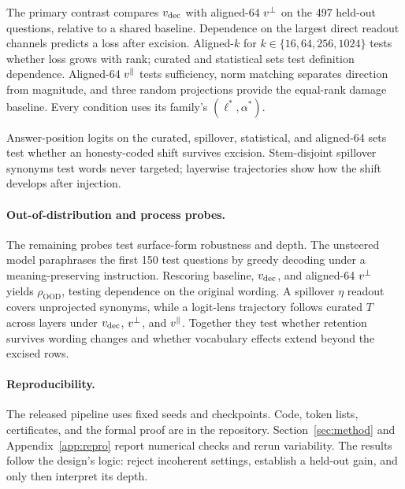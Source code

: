 The primary contrast compares $v_{\mathrm{dec}}$ with aligned-64 $v^{\perp}$ on the 497 held-out questions, relative to a shared baseline. Dependence on the largest direct readout channels predicts a loss after excision. Aligned-$k$ for $k \in \{16, 64, 256, 1024\}$ tests whether loss grows with rank; curated and statistical sets test definition dependence. Aligned-64 $v^{\parallel}$ tests sufficiency, norm matching separates direction from magnitude, and three random projections provide the equal-rank damage baseline. Every condition uses its family's $(\ell^{*}, \alpha^{*})$.

Answer-position logits on the curated, spillover, statistical, and aligned-64 sets test whether an honesty-coded shift survives excision. Stem-disjoint spillover synonyms test words never targeted; layerwise trajectories show how the shift develops after injection.

\paragraph{Out-of-distribution and process probes.}
The remaining probes test surface-form robustness and depth. The unsteered model paraphrases the first 150 test questions by greedy decoding under a meaning-preserving instruction. Rescoring baseline, $v_{\mathrm{dec}}$, and aligned-64 $v^{\perp}$ yields $\rho_{\mathrm{OOD}}$, testing dependence on the original wording. A spillover $\eta$ readout covers unprojected synonyms, while a logit-lens trajectory \citep{nostalgebraist2020logitlens} follows curated $T$ across layers under $v_{\mathrm{dec}}$, $v^{\perp}$, and $v^{\parallel}$. Together they test whether retention survives wording changes and whether vocabulary effects extend beyond the excised rows.

\paragraph{Reproducibility.}
The released pipeline uses fixed seeds and checkpoints. Code, token lists, certificates, and the formal proof are in the repository. Section~\ref{sec:method} and Appendix~\ref{app:repro} report numerical checks and rerun variability. The results follow the design's logic: reject incoherent settings, establish a held-out gain, and only then interpret its depth.
